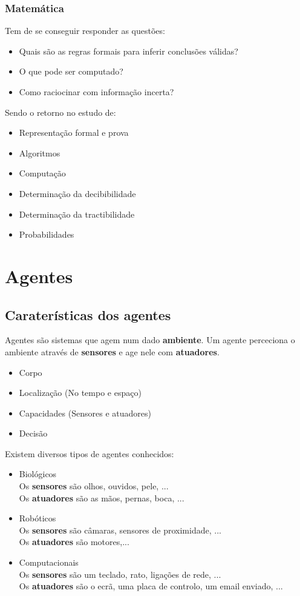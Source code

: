 \documentclass[]{report}
\begin{document}
\subsection{Matemática}
Tem de se conseguir responder as questões:
\begin{itemize}
\item Quais são as regras formais para inferir conclusões válidas?
\item O que pode ser computado?
\item Como raciocinar com informação incerta?
\end{itemize}
Sendo o retorno no estudo de:
\begin{itemize}
\item Representação formal e prova
\item Algoritmos
\item Computação
\item Determinação da decibibilidade
\item Determinação da tractibilidade
\item Probabilidades
\end{itemize}



\chapter{Agentes}
\section{Caraterísticas dos agentes}
Agentes são sistemas que agem num dado \textbf{ambiente}.
Um agente perceciona o ambiente através de \textbf{sensores} e age nele com \textbf{atuadores}.
\begin{itemize}
\item Corpo
\item Localização (No tempo e espaço)
\item Capacidades (Sensores e atuadores)
\item Decisão
\end{itemize}
Existem diversos tipos de agentes conhecidos:
\begin{itemize}
\item Biológicos\\
Os \textbf{sensores} são olhos, ouvidos, pele, ...\\
Os \textbf{atuadores} são as mãos, pernas, boca, ...
\item Robóticos\\
Os \textbf{sensores} são câmaras, sensores de proximidade, ...\\
Os \textbf{atuadores} são motores,...
\item Computacionais\\
Os \textbf{sensores} são um teclado, rato, ligações de rede, ...\\
Os \textbf{atuadores} são o ecrã, uma placa de controlo, um email enviado, ...
\end{itemize}
\end{document}

